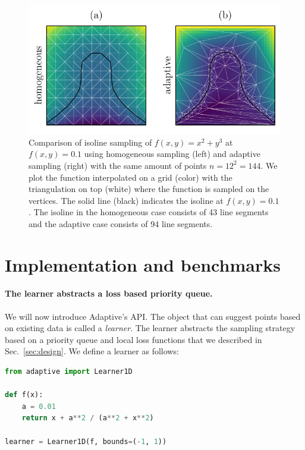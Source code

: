 \documentclass[english, twocolumn, 10pt, aps, superscriptaddress, floatfix, prb, citeautoscript]{revtex4-1}
\begin{document}
\begin{figure}
\centering
\includegraphics{figures/isoline.pdf}
\caption{Comparison of isoline sampling of \(f(x,y)=x^2 + y^3\) at \(f(x,y)=0.1\) using homogeneous sampling (left) and adaptive sampling (right) with the same amount of points \(n=12^2=144\).
We plot the function interpolated on a grid (color) with the triangulation on top (white) where the function is sampled on the vertices.
The solid line (black) indicates the isoline at \(f(x,y)=0.1\).
The isoline in the homogeneous case consists of 43 line segments and the adaptive case consists of 94 line segments.\label{fig:isoline}}
\end{figure}

\section{Implementation and benchmarks}

\paragraph{The learner abstracts a loss based priority queue.}

We will now introduce Adaptive's API.
The object that can suggest points based on existing data is called a \emph{learner}.
The learner abstracts the sampling strategy based on a priority queue and local loss functions that we described in Sec.~\ref{sec:design}.
We define a learner as follows:

\begin{lstlisting}[language=Python]
from adaptive import Learner1D

def f(x):
    a = 0.01
    return x + a**2 / (a**2 + x**2)

learner = Learner1D(f, bounds=(-1, 1))
\end{lstlisting}
\end{document}
